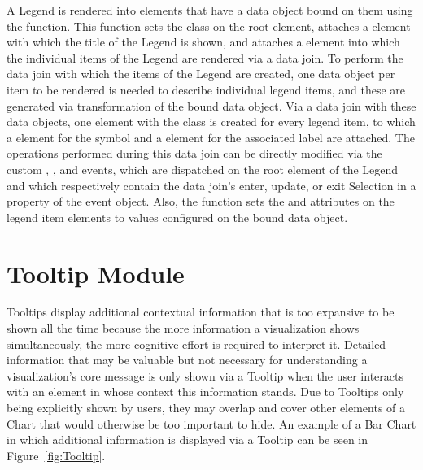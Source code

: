 A Legend is rendered into elements that have a  data
object bound on them using the  function.  This
function sets the  class on the root element, attaches a
 element with which the title of the Legend is shown, and
attaches a  element into which the individual items of the
Legend are rendered via a data join.  To perform the data join with
which the items of the Legend are created, one  data
object per item to be rendered is needed to describe individual legend
items, and these are generated via transformation of the bound
 data object.  Via a data join with these data objects,
one  element with the  class is created
for every legend item, to which a  element for the symbol
and a  element for the associated label are attached.
The operations performed during this data join can be directly
modified via the custom , , and 
events, which are dispatched on the root element of the Legend and
which respectively contain the data join's enter, update, or exit
Selection in a property of the event object.  Also, the
 function sets the  and
 attributes on the legend item elements to values
configured on the bound  data object.





\section{Tooltip Module}
\label{sec:TooltipModule}

Tooltips display additional contextual information that is too
expansive to be shown all the time because the more information a
visualization shows simultaneously, the more cognitive effort is
required to interpret it.  Detailed information that may be valuable
but not necessary for understanding a visualization's core message is
only shown via a Tooltip when the user interacts with an element in
whose context this information stands.  Due to Tooltips only being
explicitly shown by users, they may overlap and cover other elements
of a Chart that would otherwise be too important to hide.  An example
of a Bar Chart in which additional information is displayed via a
Tooltip can be seen in Figure~\ref{fig:Tooltip}.


